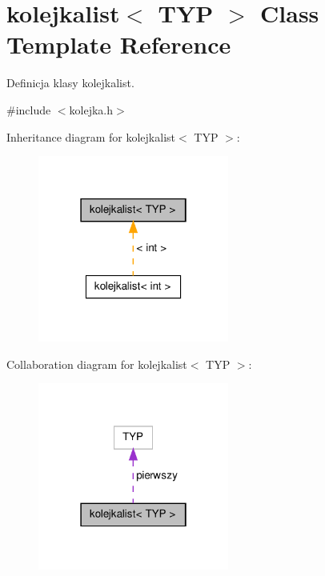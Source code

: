 \hypertarget{classkolejkalist}{\section{kolejkalist$<$ T\-Y\-P $>$ Class Template Reference}
\label{classkolejkalist}
}


Definicja klasy kolejkalist.  




{\ttfamily \#include $<$kolejka.\-h$>$}



Inheritance diagram for kolejkalist$<$ T\-Y\-P $>$\-:\nopagebreak
\begin{figure}[H]
\begin{center}
\leavevmode
\includegraphics[width=178pt]{classkolejkalist__inherit__graph}
\end{center}
\end{figure}


Collaboration diagram for kolejkalist$<$ T\-Y\-P $>$\-:\nopagebreak
\begin{figure}[H]
\begin{center}
\leavevmode
\includegraphics[width=178pt]{classkolejkalist__coll__graph}
\end{center}
\end{figure}
